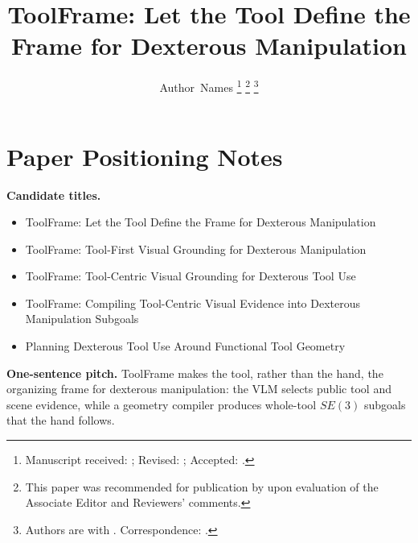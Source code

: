 \documentclass[journal]{IEEEtran}
\title{ToolFrame: Let the Tool Define the Frame for Dexterous Manipulation}
\author{Author~Names%
\thanks{Manuscript received: \todo{date}; Revised: \todo{date}; Accepted: \todo{date}.}%
\thanks{This paper was recommended for publication by \todo{Editor name} upon evaluation of the Associate Editor and Reviewers' comments.}%
\thanks{Authors are with \todo{affiliation}. Correspondence: \todo{email}.}%
}
\newcommand{\method}{ToolFrame}
\begin{document}
\maketitle

\section*{Paper Positioning Notes}
\textbf{Candidate titles.}
\begin{itemize}
  \item \method: Let the Tool Define the Frame for Dexterous Manipulation
  \item \method: Tool-First Visual Grounding for Dexterous Manipulation
  \item \method: Tool-Centric Visual Grounding for Dexterous Tool Use
  \item \method: Compiling Tool-Centric Visual Evidence into Dexterous Manipulation Subgoals
  \item Planning Dexterous Tool Use Around Functional Tool Geometry
\end{itemize}
\textbf{One-sentence pitch.} \method{} makes the tool, rather than the hand, the
organizing frame for dexterous manipulation: the VLM selects public tool and
scene evidence, while a geometry compiler produces whole-tool $SE(3)$ subgoals
that the hand follows.
\end{document}
